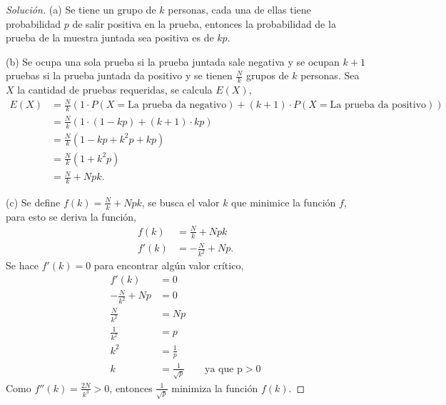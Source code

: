 \documentclass[12pt,letterpaper]{article}
\begin{document}
\begin{proof}[Solución]
(a) Se tiene un grupo de $k$ personas, cada una de ellas tiene probabilidad $p$ de salir positiva en la prueba, entonces la probabilidad de la prueba de la muestra juntada sea positiva es de $kp.$ 

(b) Se ocupa una sola prueba si la prueba juntada sale negativa y se ocupan $k+1$ pruebas si la prueba juntada da positivo y se tienen $\frac{N}{k}$ grupos de $k$ personas. Sea $X$ la cantidad de pruebas requeridas, se calcula $E(X)$,
\begin{align}
E(X) &= \frac{N}{k} \left( 1 \cdot P(X=\text{La prueba da negativo}) + (k+1)\cdot P(X=\text{La prueba da positivo})\right) \\ & = \frac{N}{k} (1 \cdot (1-kp) + (k+1) \cdot kp) \\ &= \frac{N}{k}(1-kp + k^2p + kp) \\ &= \frac{N}{k} (1+k^2p) \\&= \frac{N}{k} + Npk. 
\end{align}

(c) Se define $f(k)=\frac{N}{k} + Npk$, se busca el valor $k$ que minimice la función $f$, para esto se deriva la función,
\begin{align}
f(k)&=\frac{N}{k} + Npk \\ f'(k) &=-\frac{N}{k^2} + Np.
\end{align}
Se hace $f'(k)=0$ para encontrar algún valor crítico, 
\begin{align}
f'(k)&=0 \\ -\frac{N}{k^2} + Np &=0 \\ \frac{N}{k^2} &= Np \\ \frac{1}{k^2} &= p \\ k^2 &= \frac{1}{p} \\ k&= \frac{1}{\sqrt{p}} \qquad \text{ya que p}>0
\end{align}
Como $f''(k)=\frac{2N}{k^3} > 0$, entonces $\frac{1}{\sqrt{p}}$ minimiza la función $f(k).$
\end{proof}
\end{document}
